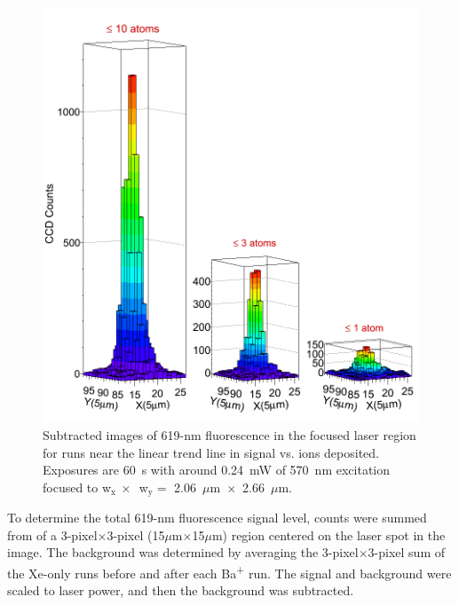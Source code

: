 \begin{figure} %
        \centering
                \includegraphics[width=.8\textwidth]{figures/train.png}
                \caption{Subtracted images of 619-nm fluorescence in the focused laser region for runs near the linear trend line in signal vs. ions deposited.  Exposures are 60~s with around 0.24~mW of 570~nm excitation focused to w$_{\text{x}}~\times$~w$_{\text{y}} =$ 2.06~$\mu$m~$\times$~2.66~$\mu$m.}
\label{fig:train}
\end{figure}

To determine the total 619-nm fluorescence signal level, counts were summed from of a 3-pixel$\times$3-pixel (15$\mu$m$\times$15$\mu$m) region centered on the laser spot in the image.  The background was determined by averaging the 3-pixel$\times$3-pixel sum of the Xe-only runs before and after each Ba\textsuperscript{+} run.  The signal and background were scaled to laser power, and then the background was subtracted.

